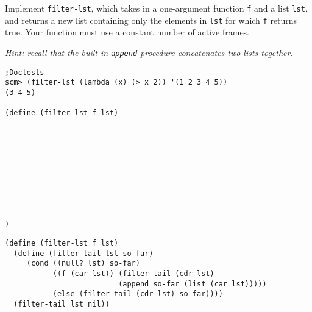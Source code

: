 \begin{blocksection}

\question Implement \lstinline{filter-lst}, which takes in a one-argument function \lstinline{f} and
a list \lstinline{lst}, and returns a new list containing only the elements in \texttt{lst}
for which \texttt{f} returns true. Your function must use a constant number of active frames.

\textit{Hint: recall that the built-in \lstinline{append} procedure concatenates two lists together. }

\begin{lstlisting}
;Doctests
scm> (filter-lst (lambda (x) (> x 2)) '(1 2 3 4 5))
(3 4 5)

(define (filter-lst f lst)










)
\end{lstlisting}

\begin{solution}[0.5in]
\begin{lstlisting}
(define (filter-lst f lst)
  (define (filter-tail lst so-far)
     (cond ((null? lst) so-far)
           ((f (car lst)) (filter-tail (cdr lst)
                          (append so-far (list (car lst)))))
           (else (filter-tail (cdr lst) so-far))))
  (filter-tail lst nil))
\end{lstlisting}
\end{solution}

\end{blocksection}

